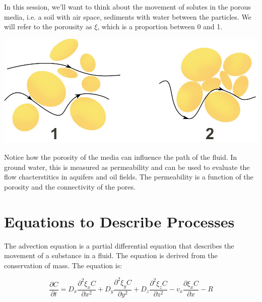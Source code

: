 \documentclass{tufte-handout}\usepackage[]{graphicx}\usepackage[]{xcolor}
\begin{document}
In this session, we'll want to think about the movement of solutes in the porous media, i.e. a soil with air space, sediments with water between the particles. We will refer to the porousity as $\xi$, which is a proportion between 0 and 1. 

\begin{marginfigure}
\centering
\includegraphics{graphics/Darcy_permeability.jpg}
\caption{Notice how the porosity of the media can influence the path of the fluid. In ground water, this is measured as permeability and can be used to evaluate the flow chacterstitics in aquifers and oil fields. The permeability is a function of the porosity and the connectivity of the pores.}
\end{marginfigure}


\section{Equations to Describe Processes}


The advection equation is a partial differential equation that describes the movement of a substance in a fluid. The equation is derived from the conservation of mass. The equation is:



\begin{equation}
\frac{\partial C}{\partial t} = D_x \frac{\partial^2  \xi_x C}{\partial x^2} +
D_y \frac{\partial^2  \xi_y C}{\partial y^2} +
D_z \frac{\partial^2  \xi_z C}{\partial z^2} -
v_x \frac{\partial  \xi_x C}{\partial x} - R
\end{equation}
\end{document}
